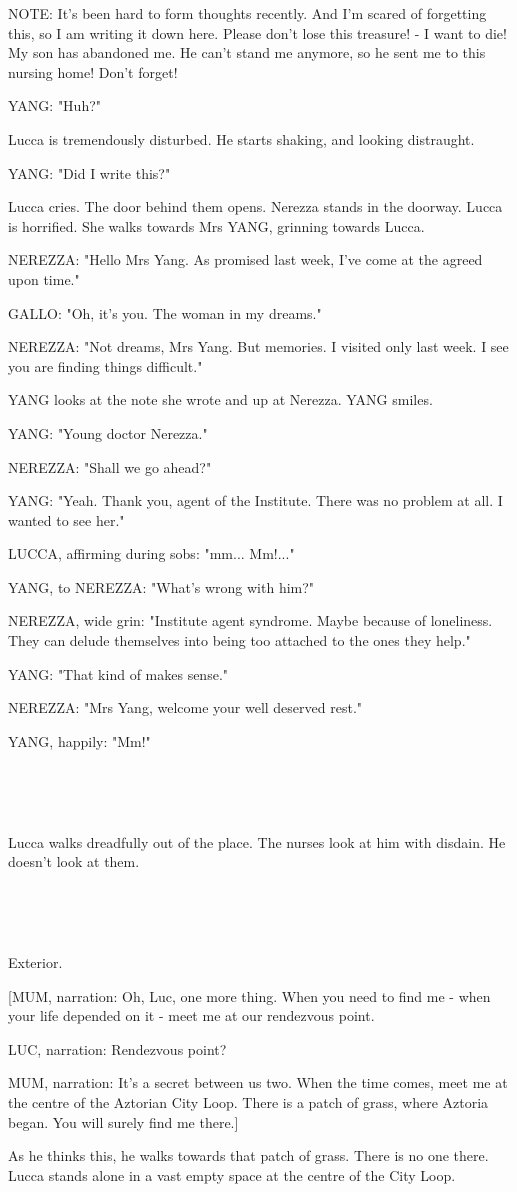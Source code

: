\documentclass[11pt]{article}
\begin{document}
NOTE: It's been hard to form thoughts recently. 
And I'm scared of forgetting this, so I am writing it down here.
Please don't lose this treasure! - I want to die!
My son has abandoned me.
He can't stand me anymore, so he sent me to this nursing home!
Don't forget!

YANG: "Huh?"

Lucca is tremendously disturbed.
He starts shaking, and looking distraught.

YANG: "Did I write this?"

Lucca cries.
The door behind them opens. 
Nerezza stands in the doorway.
Lucca is horrified.
She walks towards Mrs YANG, grinning towards Lucca.

NEREZZA: "Hello Mrs Yang. 
As promised last week, I've come at the agreed upon time."

GALLO: "Oh, it's you.
The woman in my dreams."

NEREZZA: "Not dreams, Mrs Yang.
But memories.
I visited only last week.
I see you are finding things difficult."

YANG looks at the note she wrote and up at Nerezza.
YANG smiles.

YANG: "Young doctor Nerezza."

NEREZZA: "Shall we go ahead?"

YANG: "Yeah. 
Thank you, agent of the Institute.
There was no problem at all.
I wanted to see her."

LUCCA, affirming during sobs: "mm... Mm!..."

YANG, to NEREZZA: "What's wrong with him?"

NEREZZA, wide grin: "Institute agent syndrome.
Maybe because of loneliness.
They can delude themselves into being too attached to the ones they help."

YANG: "That kind of makes sense."

NEREZZA: "Mrs Yang, welcome your well deserved rest."

YANG, happily: "Mm!"

\ 

\ 

Lucca walks dreadfully out of the place.
The nurses look at him with disdain.
He doesn't look at them.

\ 

\ 

Exterior.

[MUM, narration: Oh, Luc, one more thing.
When you need to find me - when your life depended on it - meet me at our rendezvous point.

LUC, narration: Rendezvous point?

MUM, narration: It's a secret between us two. 
When the time comes, meet me at the centre of the Aztorian City Loop.
There is a patch of grass, where Aztoria began.
You will surely find me there.]

As he thinks this, he walks towards that patch of grass.
There is no one there.
Lucca stands alone in a vast empty space at the centre of the City Loop.
\end{document}
